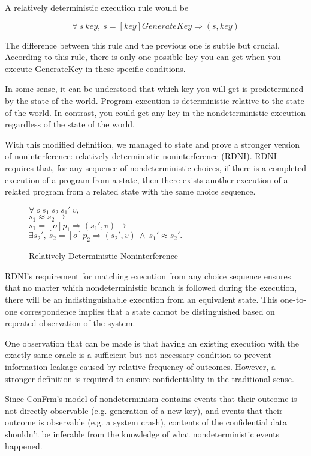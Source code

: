 A relatively deterministic execution rule would be

$$\forall\ s\ key,\ s  =[key]GenerateKey\Rightarrow (s, key)$$ 

The difference between this rule and the previous one is subtle but crucial. 
According to this rule, there is only one possible key you can get when you execute GenerateKey in these specific conditions.

In some sense, it can be understood that which key you will get is predetermined by the state of the world. Program execution is deterministic relative to the state of the world.
In contrast, you could get any key in the nondeterministic execution regardless of the state of the world.

With this modified definition, we managed to state and prove a stronger version of noninterference: relatively deterministic noninterference (RDNI). RDNI requires that, for any sequence of nondeterministic choices, if there is a completed execution of a program from a state, then there exists another execution of a related program from a related state with the same choice sequence.

\begin{figure}[H]
	$\forall\ o\ s_1\ s_2\ s_1'\ v,$\\
	$s_1\approx s_2 \rightarrow$\\
	$s_1 =[o]p_1\Rightarrow (s_1', v) \rightarrow$\\
	$\exists s_2',\ s_2 =[o]p_2\Rightarrow (s_2', v)\ \wedge\ s_1'\approx s_2'.$\\
	\caption{Relatively Deterministic Noninterference}
\end{figure}

RDNI's requirement for matching execution from any choice sequence ensures that no matter which nondeterministic branch is followed during the execution, there will be an indistinguishable execution from an equivalent state. This one-to-one correspondence implies that a state cannot be distinguished based on repeated observation of the system.

One observation that can be made is that having an existing execution with the exactly same oracle is a sufficient but not necessary condition to prevent information leakage caused by relative frequency of outcomes. However, a stronger definition is required to ensure confidentiality in the traditional sense.

Since ConFrm's model of nondeterminism contains events that their outcome is not directly observable (e.g. generation of a new key), and events that their outcome is observable (e.g. a system crash), contents of the confidential data shouldn't be inferable from the knowledge of what nondeterministic events happened.

